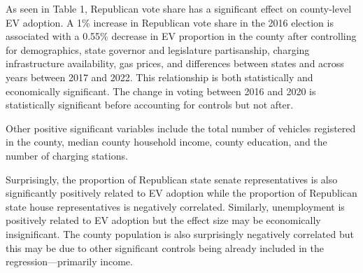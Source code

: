 \documentclass{article}
\begin{document}
As seen in Table 1, Republican vote share has a significant effect on county-level EV adoption. A 1\% increase in Republican vote share in the 2016 election is associated with a 0.55\% decrease in EV proportion in the county after controlling for demographics, state governor and legislature partisanship, charging infrastructure availability, gas prices, and differences between states and across years between 2017 and 2022. This relationship is both statistically and economically significant. The change in voting between 2016 and 2020 is statistically significant before accounting for controls but not after. 

Other positive significant variables include the total number of vehicles registered in the county, median county household income, county education, and the number of charging stations. 

Surprisingly, the proportion of Republican state senate representatives is also significantly positively related to EV adoption while the proportion of Republican state house representatives is negatively correlated. Similarly, unemployment is positively related to EV adoption but the effect size may be economically insignificant. The county population is also surprisingly negatively correlated but this may be due to other significant controls being already included in the regression—primarily income.  
\end{document}
